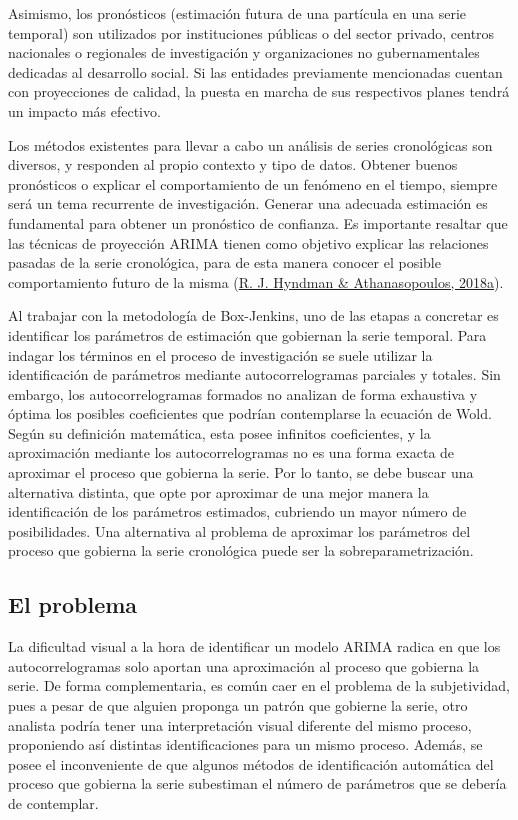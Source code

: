 \documentclass[
]{article}
\begin{document}
Asimismo, los pronósticos (estimación futura de una partícula en una
serie temporal) son utilizados por instituciones públicas o del sector
privado, centros nacionales o regionales de investigación y
organizaciones no gubernamentales dedicadas al desarrollo social. Si las
entidades previamente mencionadas cuentan con proyecciones de calidad,
la puesta en marcha de sus respectivos planes tendrá un impacto más
efectivo.

Los métodos existentes para llevar a cabo un análisis de series
cronológicas son diversos, y responden al propio contexto y tipo de
datos. Obtener buenos pronósticos o explicar el comportamiento de un
fenómeno en el tiempo, siempre será un tema recurrente de investigación.
Generar una adecuada estimación es fundamental para obtener un
pronóstico de confianza. Es importante resaltar que las técnicas de
proyección ARIMA tienen como objetivo explicar las relaciones pasadas de
la serie cronológica, para de esta manera conocer el posible
comportamiento futuro de la misma
(\protect\hyperlink{ref-hyndman2018forecasting}{R. J. Hyndman \&
Athanasopoulos, 2018a}).

Al trabajar con la metodología de Box-Jenkins, uno de las etapas a
concretar es identificar los parámetros de estimación que gobiernan la
serie temporal. Para indagar los términos en el proceso de investigación
se suele utilizar la identificación de parámetros mediante
autocorrelogramas parciales y totales. Sin embargo, los
autocorrelogramas formados no analizan de forma exhaustiva y óptima los
posibles coeficientes que podrían contemplarse la ecuación de Wold.
Según su definición matemática, esta posee infinitos coeficientes, y la
aproximación mediante los autocorrelogramas no es una forma exacta de
aproximar el proceso que gobierna la serie. Por lo tanto, se debe buscar
una alternativa distinta, que opte por aproximar de una mejor manera la
identificación de los parámetros estimados, cubriendo un mayor número de
posibilidades. Una alternativa al problema de aproximar los parámetros
del proceso que gobierna la serie cronológica puede ser la
sobreparametrización.

\subsection{El problema}

La dificultad visual a la hora de identificar un modelo ARIMA radica en
que los autocorrelogramas solo aportan una aproximación al proceso que
gobierna la serie. De forma complementaria, es común caer en el problema
de la subjetividad, pues a pesar de que alguien proponga un patrón que
gobierne la serie, otro analista podría tener una interpretación visual
diferente del mismo proceso, proponiendo así distintas identificaciones
para un mismo proceso. Además, se posee el inconveniente de que algunos
métodos de identificación automática del proceso que gobierna la serie
subestiman el número de parámetros que se debería de contemplar.
\end{document}
